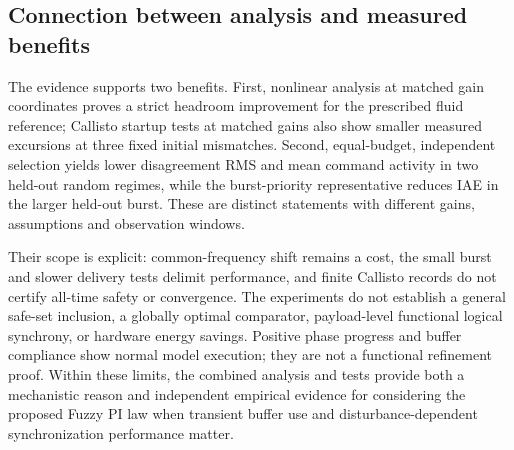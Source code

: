 \subsection{Connection between analysis and measured benefits}
\label{detail:subsec:eval_support}

The evidence supports two benefits. First, nonlinear analysis at
matched gain coordinates proves a strict headroom improvement for the
prescribed fluid reference; Callisto startup tests at matched gains also show
smaller measured excursions at three fixed initial mismatches. Second,
equal-budget, independent selection yields lower disagreement RMS and
mean command activity in two held-out random regimes, while the
burst-priority representative reduces IAE in the larger held-out burst.
These are distinct statements with different gains, assumptions and
observation windows.

Their scope is explicit: common-frequency shift remains a cost, the
small burst and slower delivery tests delimit performance, and finite
Callisto records do not certify all-time safety or convergence. The
experiments do not establish a general safe-set inclusion, a globally
optimal comparator, payload-level functional logical synchrony, or
hardware energy savings. Positive phase progress and buffer compliance
show normal model execution; they are not a functional refinement proof.
Within these limits, the combined analysis and tests provide both a
mechanistic reason and independent empirical evidence for considering
the proposed Fuzzy PI law when transient buffer use and
disturbance-dependent synchronization performance matter.


